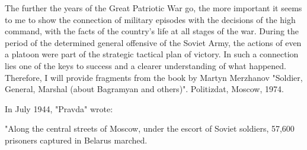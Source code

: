 \begin{paracol}{2}

{
The further the years of the Great Patriotic War go, the more important it seems to me to show the connection of military episodes with the decisions of the high command, with the facts of the country's life at all stages of the war. During the period of the determined general offensive of the Soviet Army, the actions of even a platoon were part of the strategic tactical plan of victory. In such a connection lies one of the keys to success and a clearer understanding of what happened. Therefore, I will provide fragments from the book by Martyn Merzhanov "Soldier, General, Marshal (about Bagramyan and others)". Politizdat, Moscow, 1974.}

{In July 1944, "Pravda" wrote:}

{
"Along the central streets of Moscow, under the escort of Soviet soldiers, 57,600 prisoners captured in Belarus marched.}


\end{paracol}

